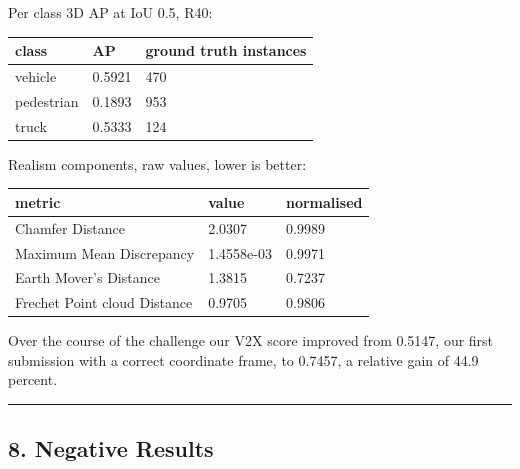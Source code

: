 \documentclass[
  10pt,
]{article}
\newcounter{none} %
\begin{document}
Per class 3D AP at IoU 0.5, R40:

{\def\LTcaptype{none} %
\begin{longtable}[]{@{}lll@{}}
\toprule\noalign{}
class & AP & ground truth instances \\
\midrule\noalign{}
\endhead
\bottomrule\noalign{}
\endlastfoot
vehicle & 0.5921 & 470 \\
pedestrian & 0.1893 & 953 \\
truck & 0.5333 & 124 \\
\end{longtable}
}

Realism components, raw values, lower is better:

{\def\LTcaptype{none} %
\begin{longtable}[]{@{}lll@{}}
\toprule\noalign{}
metric & value & normalised \\
\midrule\noalign{}
\endhead
\bottomrule\noalign{}
\endlastfoot
Chamfer Distance & 2.0307 & 0.9989 \\
Maximum Mean Discrepancy & 1.4558e-03 & 0.9971 \\
Earth Mover's Distance & 1.3815 & 0.7237 \\
Frechet Point cloud Distance & 0.9705 & 0.9806 \\
\end{longtable}
}

Over the course of the challenge our V2X score improved from 0.5147, our
first submission with a correct coordinate frame, to 0.7457, a relative
gain of 44.9 percent.

\begin{center}\rule{0.5\linewidth}{0.5pt}\end{center}

\subsection{8. Negative Results}\label{negative-results}
\end{document}

